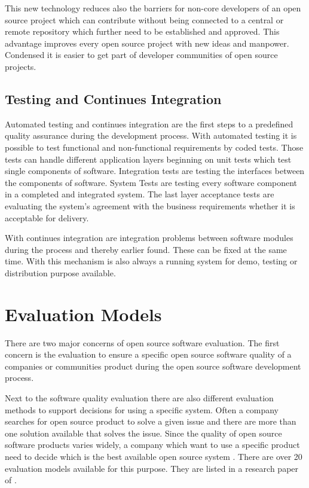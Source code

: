 \documentclass[DIV=calc,paper=a4,fontsize=9pt,twocolumn]{scrartcl}
\begin{document}
This new technology reduces also the barriers for non-core developers of an open source project which can contribute without being connected to a central or remote repository which further need to be established and approved. This advantage improves every open source project with new ideas and manpower. Condensed it is easier to get part of developer communities of open source projects. \citep{rodriguez2012distributed}

\subsection{Testing and Continues Integration}

Automated testing and continues integration are the first steps to a predefined quality assurance during the development process. With automated testing it is possible to test functional and non-functional requirements by coded tests. Those tests can handle different application layers beginning on unit tests which test single components of software. Integration tests are testing the interfaces between the components of software. System Tests are testing every software component in a completed and integrated system. The last layer acceptance tests are evaluating the system's agreement with the business requirements whether it is acceptable for delivery. \citep{abran2001guide}

With continues integration are integration problems between software modules during the process and thereby earlier found. These can be fixed at the same time. With this mechanism is also always a running system for demo, testing or distribution purpose available.

\section{Evaluation Models}

There are two major concerns of open source software evaluation. The first concern is the evaluation to ensure a specific open source software quality of a companies or communities product during the open source software development process. 

Next to the software quality evaluation there are also different evaluation methods to support decisions for using a specific system. Often a company searches for open source product to solve a given issue and there are more than one solution available that solves the issue. Since the quality of open source software products varies widely, a company which want to use a specific product need to decide which is the best available open source system \citep{stol2010comparison}. There are over 20 evaluation models available for this purpose. They are listed in a research paper of \citet{stol2010comparison}.
\end{document}
